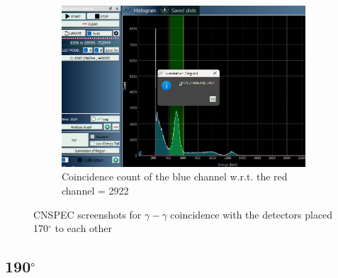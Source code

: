 \begin{figure}[H]
    \ContinuedFloat
    

    \begin{subfigure}{\linewidth}
        \includegraphics[width=1\textwidth]{images/170/ccblue.png}
        \caption{Coincidence count of the blue channel w.r.t. the red channel = 2922}
    \end{subfigure}

    \caption{CNSPEC screenshots for $\gamma-\gamma$ coincidence with the detectors placed 170$^\circ$ to each other}
    \label{170}
\end{figure}

\subsection{190$^\circ$}

